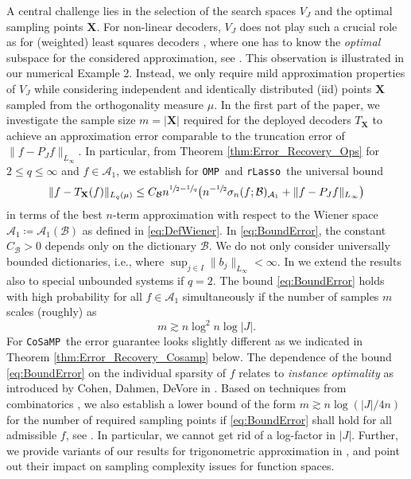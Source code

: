 \documentclass[11pt,reqno, a4paper]{article}
\numberwithin{equation}{section}
\newcommand{\rlasso}{\texttt{rLasso}}
\newcommand{\omp}{\texttt{OMP}}
\newcommand{\cosamp}{\texttt{CoSaMP}}
\begin{document}
A central challenge lies in the selection of the search spaces $V_J$ and the optimal sampling points $\mathbf{X}$.
For non-linear decoders, $V_J$ does not play such a crucial role as for (weighted) least squares decoders \cite{CoMi16}, where one has to know the {\em optimal} subspace for the considered approximation, see .
This observation is illustrated in our numerical Example 2.
Instead, we only require mild approximation properties of $V_J$ while considering independent and identically distributed (iid) points $\mathbf{X}$ sampled from the orthogonality measure $\mu$. 
In the first part of the paper, we investigate the sample size $m = \lvert\mathbf{X}\rvert$ required for the deployed decoders $T_{\mathbf{X}}$ to achieve an approximation error comparable to the truncation error of $\|f-P_Jf\|_{L_\infty}$.
In particular, from Theorem \ref{thm:Error_Recovery_Ops} for $2\leq q\leq \infty$ and $f\in \mathcal{A}_1$, we establish for \omp\ and \rlasso \ the universal bound 
\begin{gather}\label{eq:BoundError}
	\lVert f - T_{\mathbf{X}}(f)\rVert_{L_q(\mu)} \leq C_{\mathcal{B}} n^{\sfrac{1}{2}-\sfrac{1}{q}}\bigl(n^{-\sfrac{1}{2}}\sigma_n(f;\mathcal{B})_{\mathcal{A}_1} + \|f-P_J f\|_{L_\infty}\bigr)
\end{gather}
in terms of the best $n$-term approximation with respect to the Wiener space $\mathcal{A}_1\coloneqq\mathcal{A}_1(\mathcal{B})$ as defined in \eqref{eq:DefWiener}.
In \eqref{eq:BoundError}, the constant $C_{\mathcal{B}}>0$ depends only on the dictionary $\mathcal{B}$. We do not only consider universally bounded dictionaries, i.e., where $\sup_{j\in I} \|b_j\|_{L_\infty} < \infty$. In  we extend the results also to special unbounded systems if $q=2$.
The bound \eqref{eq:BoundError} holds with high probability for all $f \in \mathcal{A}_1$ simultaneously if the number of samples $m$ scales (roughly) as 
\begin{equation}\label{eq:sampl}
    m\gtrsim n\log^2 n\log|J|.
\end{equation}
For \cosamp\ the error guarantee looks slightly different as we indicated in Theorem \ref{thm:Error_Recovery_Cosamp} below.  
The dependence of the bound \eqref{eq:BoundError} on the individual sparsity of $f$ relates to \emph{instance optimality} as introduced by Cohen, Dahmen, DeVore in \cite{CDD09}.
Based on techniques from combinatorics \cite{FouPajRauUll10, FoRa13}, we also establish a lower bound of the form $m \gtrsim n\log(\lvert J\rvert/4n)$ for the number of required sampling points if \eqref{eq:BoundError} shall hold for all admissible $f$, see .
In particular, we cannot get rid of a log-factor in $\vert J \vert$.
Further, we provide variants of our results for trigonometric approximation in , and point out their impact on sampling complexity issues for function spaces.
\end{document}
